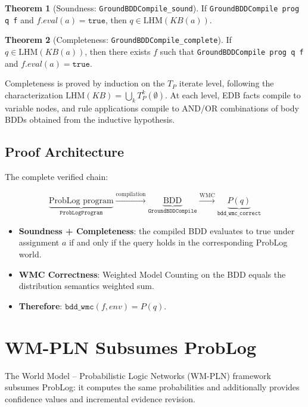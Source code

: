 \documentclass[11pt,a4paper]{article}
\theoremstyle{definition}
\newtheorem{theorem}{Theorem}[section]
\begin{document}
\begin{theorem}[Soundness: \texttt{GroundBDDCompile\_sound}]
If \texttt{GroundBDDCompile prog q f} and $f.\mathit{eval}(a) = \texttt{true}$,
then $q \in \mathrm{LHM}(\mathit{KB}(a))$.
\end{theorem}

\begin{theorem}[Completeness: \texttt{GroundBDDCompile\_complete}]
If $q \in \mathrm{LHM}(\mathit{KB}(a))$, then there exists $f$ such that
\texttt{GroundBDDCompile prog q f} and $f.\mathit{eval}(a) = \texttt{true}$.
\end{theorem}

Completeness is proved by induction on the $T_P$ iterate level, following
the characterization $\mathrm{LHM}(\mathit{KB}) = \bigcup_k T_P^k(\emptyset)$.
At each level, EDB facts compile to variable nodes, and rule applications
compile to AND/OR combinations of body BDDs obtained from the inductive
hypothesis.

\subsection{Proof Architecture}

The complete verified chain:

\[
\underbrace{\text{ProbLog program}}_{\texttt{ProbLogProgram}}
\xrightarrow{\text{compilation}}
\underbrace{\text{BDD}}_{\texttt{GroundBDDCompile}}
\xrightarrow{\text{WMC}}
\underbrace{P(q)}_{\texttt{bdd\_wmc\_correct}}
\]

\begin{itemize}
\item \textbf{Soundness + Completeness}: the compiled BDD evaluates to true
  under assignment $a$ if and only if the query holds in the corresponding
  ProbLog world.
\item \textbf{WMC Correctness}: Weighted Model Counting on the BDD equals
  the distribution semantics weighted sum.
\item \textbf{Therefore}: $\texttt{bdd\_wmc}(f, \mathit{env}) = P(q)$.
\end{itemize}

\section{WM-PLN Subsumes ProbLog}

The World Model -- Probabilistic Logic Networks (WM-PLN) framework
subsumes ProbLog: it computes the same probabilities and additionally
provides confidence values and incremental evidence revision.
\end{document}
